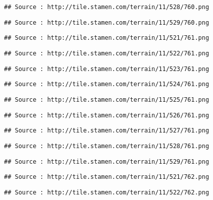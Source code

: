 \documentclass[
]{article}
\begin{document}
\begin{verbatim}
## Source : http://tile.stamen.com/terrain/11/528/760.png
\end{verbatim}

\begin{verbatim}
## Source : http://tile.stamen.com/terrain/11/529/760.png
\end{verbatim}

\begin{verbatim}
## Source : http://tile.stamen.com/terrain/11/521/761.png
\end{verbatim}

\begin{verbatim}
## Source : http://tile.stamen.com/terrain/11/522/761.png
\end{verbatim}

\begin{verbatim}
## Source : http://tile.stamen.com/terrain/11/523/761.png
\end{verbatim}

\begin{verbatim}
## Source : http://tile.stamen.com/terrain/11/524/761.png
\end{verbatim}

\begin{verbatim}
## Source : http://tile.stamen.com/terrain/11/525/761.png
\end{verbatim}

\begin{verbatim}
## Source : http://tile.stamen.com/terrain/11/526/761.png
\end{verbatim}

\begin{verbatim}
## Source : http://tile.stamen.com/terrain/11/527/761.png
\end{verbatim}

\begin{verbatim}
## Source : http://tile.stamen.com/terrain/11/528/761.png
\end{verbatim}

\begin{verbatim}
## Source : http://tile.stamen.com/terrain/11/529/761.png
\end{verbatim}

\begin{verbatim}
## Source : http://tile.stamen.com/terrain/11/521/762.png
\end{verbatim}

\begin{verbatim}
## Source : http://tile.stamen.com/terrain/11/522/762.png
\end{verbatim}
\end{document}

